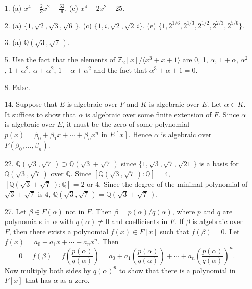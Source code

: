 {\small
\begin{itemize}
 
\item[1.] 
(a) $x^4 -\frac{2}{3} x^2 - \frac{62}{9}$.
(c) $x^4 - 2 x^2 + 25$.
 
\item[2.] 
(a) $\{ 1, \sqrt{2}, \sqrt{3}, \sqrt{6}\, \}$.
(c) $\{ 1, i, \sqrt{2}, \sqrt{2}\, i \}$.
(e) $\{1, 2^{1/6}, 2^{1/3}, 2^{1/2}, 2^{2/3}, 2^{5/6}  \}$.
 
\item[3.]
(a) ${\mathbb Q}(\sqrt{3}, \sqrt{7}\, )$.
 

\item[5.]
Use the fact that the elements of ${\mathbb Z}_2[x]/ \langle x^3 + x +
1\rangle$ are 0, 1, $\alpha$, $1 + \alpha$, $\alpha^2$, $1 + \alpha^2$,
$\alpha + \alpha^2$, $1 + \alpha + \alpha^2$ and the fact that
$\alpha^3 + \alpha + 1 = 0$. 


\item[8.]
False.


\item[14.]
Suppose that $E$ is algebraic over $F$ and $K$ is
algebraic over $E$. Let $\alpha \in K$. It suffices to show that
$\alpha$ is algebraic over some finite extension of $F$. Since
$\alpha$ is algebraic over $E$, it must be the zero of some polynomial
$p(x) = \beta_0 + \beta_1 x + \cdots + \beta_n x^n$ in $E[x]$. Hence
$\alpha$ is algebraic over $F(\beta_0, \ldots, \beta_n)$.


\item[22.]
${\mathbb Q}( \sqrt{3}, \sqrt{7}\, ) \supset {\mathbb Q}( \sqrt{3} +\sqrt{7}\,
)$ since $\{ 1, \sqrt{3}, \sqrt{7}, \sqrt{21}\, \}$ is a basis for
${\mathbb Q}( \sqrt{3}, \sqrt{7}\, )$ over ${\mathbb Q}$. Since $[{\mathbb Q}(
\sqrt{3}, \sqrt{7}\, ) : {\mathbb Q}] = 4$, $[{\mathbb Q}( \sqrt{3}
+\sqrt{7}\, ) : {\mathbb Q}] = 2$ or 4. Since the degree of the minimal
polynomial of $\sqrt{3} +\sqrt{7}$ is 4, ${\mathbb Q}( \sqrt{3},
\sqrt{7}\, ) = {\mathbb Q}( \sqrt{3} +\sqrt{7}\, )$.


\item[27.]
Let $\beta \in F(\alpha)$ not in $F$. Then $\beta =
p(\alpha)/q(\alpha)$, where $p$ and $q$ are polynomials in $\alpha$
with $q(\alpha) \neq 0$ and coefficients in $F$. If $\beta$ is
algebraic over $F$, then there exists a polynomial $f(x) \in F[x]$
such that $f(\beta) = 0$. Let $f(x) = a_0 + a_1 x + \cdots + a_n x^n$.
Then  
\[
0 = f(\beta) = f\left( 
\frac{p(\alpha)}{q(\alpha)} \right)
= a_0 + a_1 \left( \frac{p(\alpha)}{q(\alpha)} \right)  + \cdots + a_n
\left( \frac{p(\alpha)}{q(\alpha)} \right)^n. 
\]
Now multiply both sides by $q(\alpha)^n$ to show that there is a
polynomial in $F[x]$ that has $\alpha$ as a zero.




\end{itemize}
}
 
